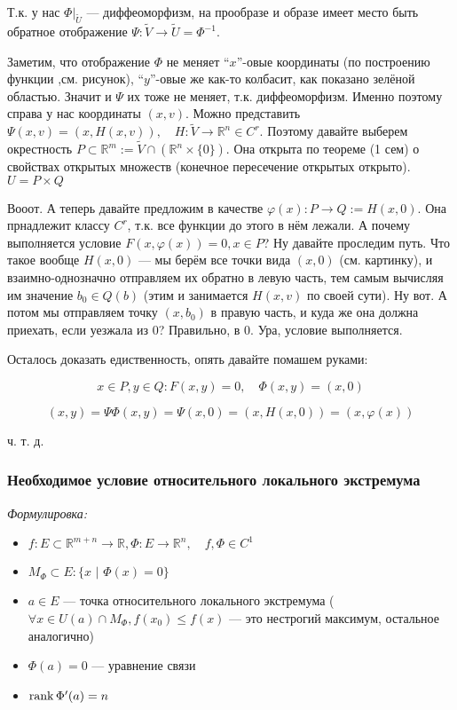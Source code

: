 \documentclass{article}
\def\dbl{\,\,}
\begin{document}
Т.к. у нас $\Phi|_{\widetilde{U}}$ --- диффеоморфизм, на прообразе и образе имеет место быть обратное отображение $\Psi: \widetilde{V} \rightarrow \widetilde{U} = \Phi^{-1}$.

Заметим, что отображение $\Phi$ не меняет ``$x$''-овые координаты (по построению функции ,см. рисунок), ``$y$''-овые же как-то колбасит, как показано зелёной областью. Значит и $\Psi$ их тоже не меняет, т.к. диффеоморфизм. Именно поэтому справа у нас координаты $(x, v)$. Можно представить $\Psi(x, v) = (x, H(x, v)), \quad H: \widetilde{V} \rightarrow \mathbb{R}^n \in C^r$. Поэтому давайте выберем окрестность $P \subset \mathbb{R}^m := \widetilde{V} \cap (\mathbb{R}^n \times \{0\})$. Она открыта по теореме (1 сем) о свойствах открытых множеств (конечное пересечение открытых открыто). $U = P \times Q$

Вооот. А теперь давайте предложим в качестве $\varphi(x): P \rightarrow Q := H(x, 0)$. Она прнадлежит классу $C^r$, т.к. все функции до этого в нём лежали. А почему выполняется условие $F(x, \varphi(x)) = 0, x \in P$? Ну давайте проследим путь. Что такое вообще $H(x, 0)$ --- мы берём все точки вида $(x, 0)$ (см. картинку), и взаимно-однозначно отправляем их обратно в левую часть, тем самым вычисляя им значение $b_0 \in Q(b)$ (этим и занимается $H(x, v)$ по своей сути). Ну вот. А потом мы отправляем точку $(x, b_0)$ в правую часть, и куда же она должна приехать, если уезжала из 0? Правильно, в 0. Ура, условие выполняется.

Осталось доказать едиственность, опять давайте помашем руками:

\[x \in P, y \in Q: F(x, y) = 0, \quad \Phi(x, y) = (x, 0)\]

\[(x, y) = \Psi\Phi(x, y) = \Psi(x, 0) = (x, H(x, 0)) = (x, \varphi(x))\]

ч. т. д.

\subsubsection{Необходимое условие относительного локального экстремума}
\textit{Формулировка:}

\begin{itemize}
    \item $f: E \subset \mathbb{R}^{m + n} \rightarrow \mathbb{R}, \Phi: E \rightarrow \mathbb{R}^n, \quad f, \Phi \in C^1$
    \item $M_\Phi \subset E: \{x \dbl | \dbl \Phi(x) = 0\}$
    \item $a \in E$ --- точка относительного локального экстремума ($\forall x \in U(a) \cap M_\Phi, f(x_0) \le f(x)$ --- это нестрогий максимум, остальное аналогично)
    \item $\Phi(a) = 0$ --- уравнение связи
    \item $\rank \Phi'(a) = n$
\end{itemize}
\end{document}
